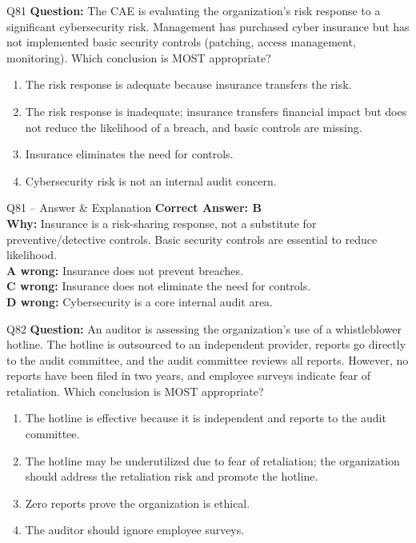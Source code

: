 \documentclass[aspectratio=169,10pt]{beamer}
\begin{document}
	\begin{frame}[t]{Q81}
		\small
		\textbf{Question:} The CAE is evaluating the organization's risk response to a significant cybersecurity risk. Management has purchased cyber insurance but has not implemented basic security controls (patching, access management, monitoring). Which conclusion is MOST appropriate?
		\begin{enumerate}[label=\Alph*.,itemsep=1pt,topsep=2pt]
			\item The risk response is adequate because insurance transfers the risk.
			\item The risk response is inadequate; insurance transfers financial impact but does not reduce the likelihood of a breach, and basic controls are missing.
			\item Insurance eliminates the need for controls.
			\item Cybersecurity risk is not an internal audit concern.
		\end{enumerate}
	\end{frame}
	
	\begin{frame}[t]{Q81 -- Answer \& Explanation}
		\small
		\textbf{Correct Answer: B} \\[4pt]
		\textbf{Why:} Insurance is a risk-sharing response, not a substitute for preventive/detective controls. Basic security controls are essential to reduce likelihood. \\[4pt]
		\textbf{A wrong:} Insurance does not prevent breaches. \\[2pt]
		\textbf{C wrong:} Insurance does not eliminate the need for controls. \\[2pt]
		\textbf{D wrong:} Cybersecurity is a core internal audit area.
	\end{frame}
	
	\begin{frame}[t]{Q82}
		\small
		\textbf{Question:} An auditor is assessing the organization's use of a whistleblower hotline. The hotline is outsourced to an independent provider, reports go directly to the audit committee, and the audit committee reviews all reports. However, no reports have been filed in two years, and employee surveys indicate fear of retaliation. Which conclusion is MOST appropriate?
		\begin{enumerate}[label=\Alph*.,itemsep=1pt,topsep=2pt]
			\item The hotline is effective because it is independent and reports to the audit committee.
			\item The hotline may be underutilized due to fear of retaliation; the organization should address the retaliation risk and promote the hotline.
			\item Zero reports prove the organization is ethical.
			\item The auditor should ignore employee surveys.
		\end{enumerate}
	\end{frame}
	
\end{document}
